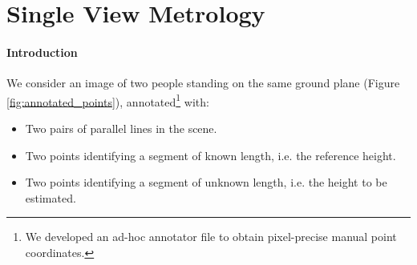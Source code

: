 \section{Single View Metrology}

\paragraph{Introduction} We consider an image of two people standing on the same ground plane (Figure \ref{fig:annotated_points}), annotated\footnote{We developed an ad-hoc annotator file to obtain pixel-precise manual point coordinates.} with:

\begin{itemize}
    \item Two pairs of parallel lines in the scene.
    \item Two points identifying a segment of known length, i.e. the reference height. 
    \item Two points identifying a segment of unknown length, i.e. the height to be estimated.
\end{itemize}

